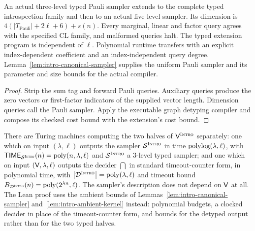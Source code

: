 \begin{lemma}
\label{lem:intro-executable-sampler}
\leanok
An actual three-level typed Pauli sampler extends to the complete typed
introspection family and then to an actual five-level sampler. Its dimension
is $4(|T_{\mathrm{Pauli}}|+2\ell+6)+s(n)$. Every marginal, linear and factor
query agrees with the specified CL family, and malformed queries halt.
The typed extension program is independent of $\ell$. Polynomial runtime
transfers with an explicit index-dependent coefficient and an index-independent
query degree. Lemma~\ref{lem:intro-canonical-sampler} supplies the uniform
Pauli sampler and its parameter and size bounds for the actual compiler.
\end{lemma}
\begin{proof}
\leanok
Strip the sum tag and forward Pauli queries. Auxiliary queries produce the
zero vectors or first-factor indicators of the supplied vector length.
Dimension queries call the Pauli sampler. Apply the executable graph detyping
compiler and compose its checked cost bound with the extension's cost bound.
\end{proof}

\begin{lemma}
\label{lem:intro-complexity}
There are Turing machines computing the two halves of $\mathsf{V}^{\textsc{Intro}}$ separately: one which on input
$(\lambda, \ell)$ outputs the sampler $\mathcal{S}^{\textsc{Intro}}$ in time $\mathrm{polylog}(\lambda, \ell)$, with
$\mathsf{TIME}_{\mathcal{S}^{\textsc{Intro}}}(n) = \mathrm{poly}(n, \lambda, \ell)$ and $\mathcal{S}^{\textsc{Intro}}$ a $3$-level typed sampler; and one
which on input $(\mathsf{V}, \lambda, \ell)$ outputs the decider $\dint$ in standard
timeout-counter form, in polynomial time, with $\left\vert {\mathcal{D}^{\textsc{Intro}}} \right\vert = \mathrm{poly}(\lambda, \ell)$ and
timeout bound $B_{\mathcal{D}^{\textsc{Intro}}}(n) = \mathrm{poly}(2^{\lambda n}, \ell)$. The sampler's description does not
depend on $\mathsf{V}$ at all.
The Lean proof uses the ambient bounds of Lemmas~\ref{lem:intro-canonical-sampler}
and~\ref{lem:intro-ambient-kernel} instead: polynomial budgets, a clocked decider in place
of the timeout-counter form, and bounds for the detyped output rather than for the two typed
halves.
\end{lemma}

